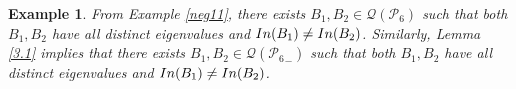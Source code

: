 \documentclass[10pt,a4paper]{amsart}
\newtheorem{eg}{Example}[section]
\numberwithin{equation}{section}
\def\In{{\rm In}}
\begin{document}
\begin{eg} \label{eg2.21}
	From Example \ref{neg11}, there exists $B_1, B_2 \in \mathcal{Q}(\mathcal{P}_6)$ such that both $B_1, B_2$ have all distinct eigenvalues and
	$\In(B_1)\neq \In(B_2)$. Similarly, Lemma \ref{3.1} implies that there exists $B_1, B_2 \in \mathcal{Q}({\mathcal{P}_{6}}_-)$ such that both $B_1, B_2$ have all distinct eigenvalues and $\In(B_1)\neq \In(B_2)$.
\end{eg}












\end{document}
